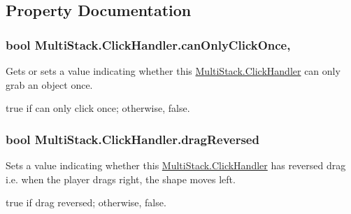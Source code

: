 \subsection{Property Documentation}
\hypertarget{class_multi_stack_1_1_click_handler_ab7cdf9c5b65265b0f17437ee6313fbeb}{}
\subsubsection[{can\+Only\+Click\+Once}]{\setlength{\rightskip}{0pt plus 5cm}bool Multi\+Stack.\+Click\+Handler.\+can\+Only\+Click\+Once\hspace{0.3cm}{\ttfamily [get]}, {\ttfamily [set]}}\label{class_multi_stack_1_1_click_handler_ab7cdf9c5b65265b0f17437ee6313fbeb}


Gets or sets a value indicating whether this \hyperlink{class_multi_stack_1_1_click_handler}{Multi\+Stack.\+Click\+Handler} can only grab an object once. 

{\ttfamily true} if can only click once; otherwise, {\ttfamily false}.\hypertarget{class_multi_stack_1_1_click_handler_a77a3775355cbfd06654ca0740d3200e3}{}
\subsubsection[{drag\+Reversed}]{\setlength{\rightskip}{0pt plus 5cm}bool Multi\+Stack.\+Click\+Handler.\+drag\+Reversed\hspace{0.3cm}{\ttfamily [set]}}\label{class_multi_stack_1_1_click_handler_a77a3775355cbfd06654ca0740d3200e3}


Sets a value indicating whether this \hyperlink{class_multi_stack_1_1_click_handler}{Multi\+Stack.\+Click\+Handler} has reversed drag i.\+e. when the player drags right, the shape moves left. 

{\ttfamily true} if drag reversed; otherwise, {\ttfamily false}.\hypertarget{class_multi_stack_1_1_click_handler_a7097c4cddc7a31d0a9d303c5367d10be}{}
